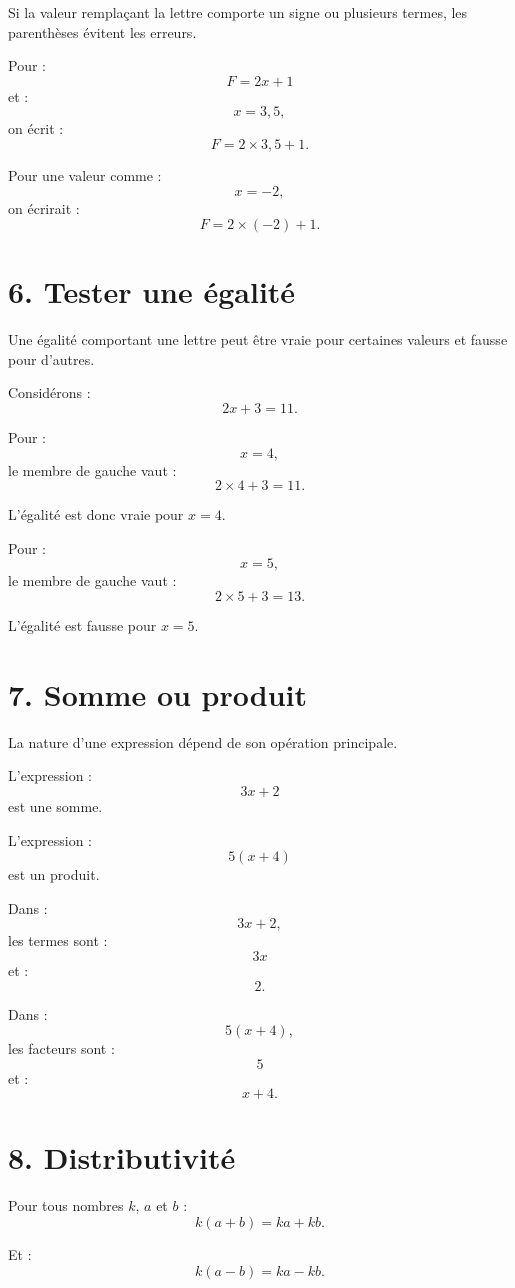 Si la valeur remplaçant la lettre comporte un signe ou plusieurs termes, les parenthèses évitent les erreurs.

Pour :
\[
F=2x+1
\]
et :
\[
x=3{,}5,
\]
on écrit :
\[
F=2\times3{,}5+1.
\]

Pour une valeur comme :
\[
x=-2,
\]
on écrirait :
\[
F=2\times(-2)+1.
\]

\section{6. Tester une égalité}

Une égalité comportant une lettre peut être vraie pour certaines valeurs et fausse pour d'autres.

Considérons :
\[
2x+3=11.
\]

Pour :
\[
x=4,
\]
le membre de gauche vaut :
\[
2\times4+3=11.
\]

L'égalité est donc vraie pour $x=4$.

Pour :
\[
x=5,
\]
le membre de gauche vaut :
\[
2\times5+3=13.
\]

L'égalité est fausse pour $x=5$.

\section{7. Somme ou produit}

La nature d'une expression dépend de son opération principale.

L'expression :
\[
3x+2
\]
est une somme.

L'expression :
\[
5(x+4)
\]
est un produit.

Dans :
\[
3x+2,
\]
les termes sont :
\[
3x
\]
et :
\[
2.
\]

Dans :
\[
5(x+4),
\]
les facteurs sont :
\[
5
\]
et :
\[
x+4.
\]

\section{8. Distributivité}


\begin{propriete}
Pour tous nombres $k$, $a$ et $b$ :
\[
\boxed{k(a+b)=ka+kb}.
\]

Et :
\[
\boxed{k(a-b)=ka-kb}.
\]
\end{propriete}


